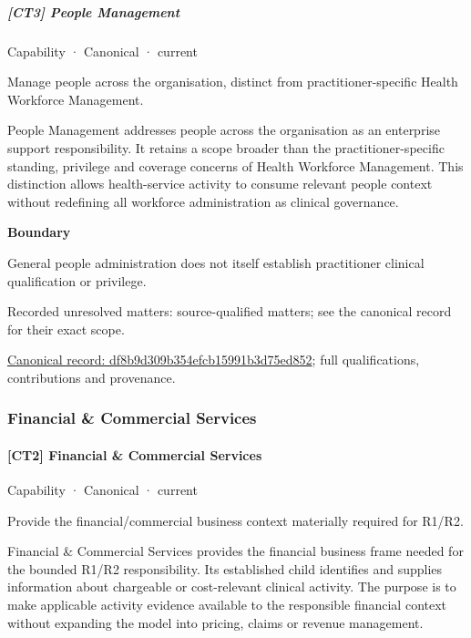 \subparagraph{[CT3] People Management}

\label{element:df8b9d309b354efcb15991b3d75ed852}
{\small Capability · Canonical · current}\par

Manage people across the organisation, distinct from practitioner-specific Health Workforce Management.



People Management addresses people across the organisation as an enterprise support responsibility. It retains a scope broader than the practitioner-specific standing, privilege and coverage concerns of Health Workforce Management. This distinction allows health-service activity to consume relevant people context without redefining all workforce administration as clinical governance.



\textbf{Boundary}



General people administration does not itself establish practitioner clinical qualification or privilege.


{\small Recorded unresolved matters: source-qualified matters; see the canonical record for their exact scope.}\par
{\footnotesize \href{../../../../continuum/strategy/capability/df8b9d309b354efcb15991b3d75ed852.md}{Canonical record: df8b9d309b354efcb15991b3d75ed852}; full qualifications, contributions and provenance.}\par
\subsubsection{Financial \& Commercial Services}

\paragraph{[CT2] Financial \& Commercial Services}

\label{element:290b574a02634f559b35a28daad0dea8}
{\small Capability · Canonical · current}\par

Provide the financial/commercial business context materially required for R1/R2.



Financial \& Commercial Services provides the financial business frame needed for the bounded R1/R2 responsibility. Its established child identifies and supplies information about chargeable or cost-relevant clinical activity. The purpose is to make applicable activity evidence available to the responsible financial context without expanding the model into pricing, claims or revenue management.



